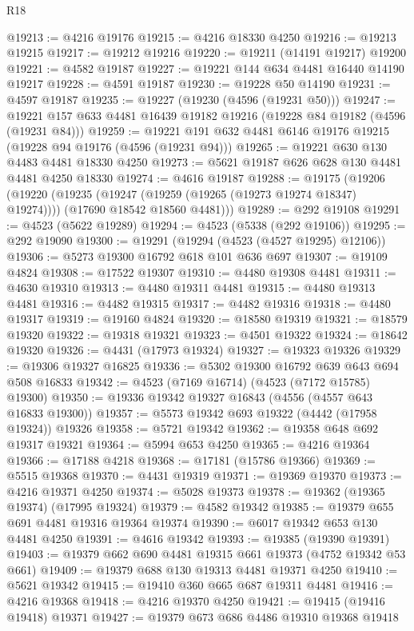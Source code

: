 \begin{lexlean}{R18}
\begin{coremodule}
@19213 := @4216 @19176
@19215 := @4216 @18330 @4250
@19216 := @19213 @19215
@19217 := @19212 @19216
@19220 := @19211 (@14191 @19217) @19200
@19221 := @4582 @19187
@19227 := @19221 @144 @634 @4481 @16440 @14190 @19217
@19228 := @4591 @19187
@19230 := @19228 @50 @14190
@19231 := @4597 @19187
@19235 := @19227 (@19230 (@4596 (@19231 @50)))
@19247 := @19221 @157 @633 @4481 @16439 @19182 @19216 (@19228 @84 @19182 (@4596 (@19231 @84)))
@19259 := @19221 @191 @632 @4481 @6146 @19176 @19215 (@19228 @94 @19176 (@4596 (@19231 @94)))
@19265 := @19221 @630 @130 @4483 @4481 @18330 @4250
@19273 := @5621 @19187 @626 @628 @130 @4481 @4481 @4250 @18330
@19274 := @4616 @19187
@19288 := @19175
    (@19206
      (@19220
        (@19235 (@19247 (@19259 (@19265 (@19273 @19274 @18347) @19274))))
        (@17690 @18542 @18560 @4481)))
@19289 := @292 @19108
@19291 := @4523 (@5622 @19289)
@19294 := @4523 (@5338 (@292 @19106))
@19295 := @292 @19090
@19300 := @19291 (@19294 (@4523 (@4527 @19295) @12106))
@19306 := @5273 @19300 @16792 @618 @101 @636 @697
@19307 := @19109 @4824
@19308 := @17522 @19307
@19310 := @4480 @19308 @4481
@19311 := @4630 @19310
@19313 := @4480 @19311 @4481
@19315 := @4480 @19313 @4481
@19316 := @4482 @19315
@19317 := @4482 @19316
@19318 := @4480 @19317
@19319 := @19160 @4824
@19320 := @18580 @19319
@19321 := @18579 @19320
@19322 := @19318 @19321
@19323 := @4501 @19322
@19324 := @18642 @19320
@19326 := @4431 (@17973 @19324)
@19327 := @19323 @19326
@19329 := @19306 @19327 @16825
@19336 := @5302 @19300 @16792 @639 @643 @694 @508 @16833
@19342 := @4523 (@7169 @16714) (@4523 (@7172 @15785) @19300)
@19350 := @19336 @19342 @19327 @16843 (@4556 (@4557 @643 @16833 @19300))
@19357 := @5573 @19342 @693 @19322 (@4442 (@17958 @19324)) @19326
@19358 := @5721 @19342
@19362 := @19358 @648 @692 @19317 @19321
@19364 := @5994 @653 @4250
@19365 := @4216 @19364
@19366 := @17188 @4218
@19368 := @17181 (@15786 @19366)
@19369 := @5515 @19368
@19370 := @4431 @19319
@19371 := @19369 @19370
@19373 := @4216 @19371 @4250
@19374 := @5028 @19373
@19378 := @19362 (@19365 @19374) (@17995 @19324)
@19379 := @4582 @19342
@19385 := @19379 @655 @691 @4481 @19316 @19364 @19374
@19390 := @6017 @19342 @653 @130 @4481 @4250
@19391 := @4616 @19342
@19393 := @19385 (@19390 @19391)
@19403 := @19379 @662 @690 @4481 @19315 @661 @19373 (@4752 @19342 @53 @661)
@19409 := @19379 @688 @130 @19313 @4481 @19371 @4250
@19410 := @5621 @19342
@19415 := @19410 @360 @665 @687 @19311 @4481
@19416 := @4216 @19368
@19418 := @4216 @19370 @4250
@19421 := @19415 (@19416 @19418) @19371
@19427 := @19379 @673 @686 @4486 @19310 @19368 @19418

\end{coremodule}
\end{lexlean}
